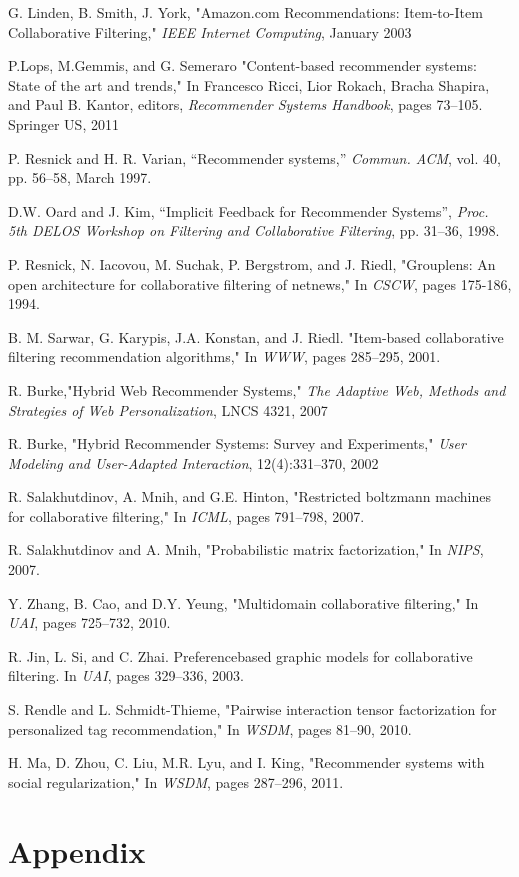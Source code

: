 \documentclass[oneside,13pt]{extreport}
\begin{document}
\begin{thebibliography}{10}
G. Linden, B. Smith, J. York, "Amazon.com Recommendations: Item-to-Item
Collaborative Filtering," \emph{IEEE Internet Computing}, January 2003

P.Lops, M.Gemmis, and G. Semeraro "Content-based recommender systems: State of the art and
trends," In Francesco Ricci, Lior Rokach, Bracha Shapira, and
Paul B. Kantor, editors, \emph{Recommender Systems Handbook},
pages 73–105. Springer US, 2011

P. Resnick and H. R. Varian, “Recommender systems,” \emph{Commun. ACM}, vol. 40, pp. 56–58, March 1997.

D.W. Oard and J. Kim, “Implicit Feedback for Recommender Systems”, \emph{Proc. 5th DELOS Workshop on Filtering and Collaborative Filtering}, pp. 31–36, 1998.

P. Resnick, N. Iacovou, M. Suchak, P. Bergstrom, and J. Riedl, "Grouplens: An open architecture for collaborative filtering of netnews," In \emph{CSCW}, pages 175-186, 1994.

B. M. Sarwar, G. Karypis, J.A. Konstan, and J. Riedl. "Item-based collaborative filtering recommendation
algorithms," In \emph{WWW}, pages 285–295, 2001.

R. Burke,"Hybrid Web Recommender Systems," \emph{The Adaptive Web,
Methods and Strategies of Web Personalization}, LNCS 4321, 2007

R. Burke, "Hybrid Recommender Systems: Survey and Experiments," \emph{User Modeling and User-Adapted Interaction}, 12(4):331–370, 2002

R. Salakhutdinov, A. Mnih, and G.E. Hinton, "Restricted boltzmann machines for collaborative
filtering," In \emph{ICML}, pages 791–798, 2007.

R. Salakhutdinov and A. Mnih, "Probabilistic matrix factorization," In \emph{NIPS}, 2007.

Y. Zhang, B. Cao, and D.Y. Yeung, "Multidomain collaborative filtering," In \emph{UAI}, pages 725–732,
2010.

R. Jin, L. Si, and C. Zhai. Preferencebased graphic models for collaborative filtering. In
\emph{UAI}, pages 329–336, 2003.

S. Rendle and L. Schmidt-Thieme, "Pairwise interaction tensor factorization for personalized tag
recommendation," In \emph{WSDM}, pages 81–90, 2010.

H. Ma, D. Zhou, C. Liu, M.R. Lyu, and I. King, "Recommender systems with social
regularization," In \emph{WSDM}, pages 287–296, 2011.

\end{thebibliography}


\chapter*{Appendix}
\label{appendix}

\printindex
\end{document}
